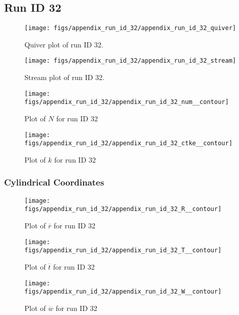 \subsection{Run ID 32}
\begin{figure}[H]
\centering
\texttt{[image: figs/appendix\_run\_id\_32/appendix\_run\_id\_32\_quiver]}
\caption{Quiver plot of run ID 32.}
\label{fig:appendix_run_id_32_quiver}
\end{figure}


\begin{figure}[H]
\centering
\texttt{[image: figs/appendix\_run\_id\_32/appendix\_run\_id\_32\_stream]}
\caption{Stream plot of run ID 32.}
\label{fig:appendix_run_id_32_stream}
\end{figure}


\begin{figure}[H]
\centering
\texttt{[image: figs/appendix\_run\_id\_32/appendix\_run\_id\_32\_num\_\_contour]}
\caption{Plot of $N$ for run ID 32}
\label{fig:appendix_run_id_32_num__contour}
\end{figure}


\begin{figure}[H]
\centering
\texttt{[image: figs/appendix\_run\_id\_32/appendix\_run\_id\_32\_ctke\_\_contour]}
\caption{Plot of $k$ for run ID 32}
\label{fig:appendix_run_id_32_ctke__contour}
\end{figure}


\subsubsection{Cylindrical Coordinates}
\begin{figure}[H]
\centering
\texttt{[image: figs/appendix\_run\_id\_32/appendix\_run\_id\_32\_R\_\_contour]}
\caption{Plot of $\overline{r}$ for run ID 32}
\label{fig:appendix_run_id_32_R__contour}
\end{figure}


\begin{figure}[H]
\centering
\texttt{[image: figs/appendix\_run\_id\_32/appendix\_run\_id\_32\_T\_\_contour]}
\caption{Plot of $\overline{t}$ for run ID 32}
\label{fig:appendix_run_id_32_T__contour}
\end{figure}


\begin{figure}[H]
\centering
\texttt{[image: figs/appendix\_run\_id\_32/appendix\_run\_id\_32\_W\_\_contour]}
\caption{Plot of $\overline{w}$ for run ID 32}
\label{fig:appendix_run_id_32_W__contour}
\end{figure}


